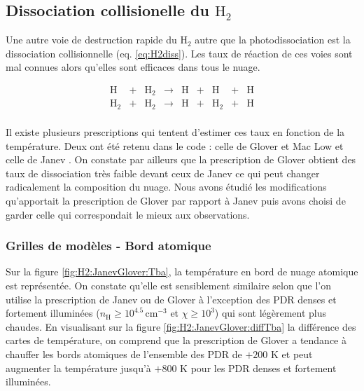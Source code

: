 
\subsection{Dissociation collisionelle du $\mathrm{H}_2$}

Une autre voie de destruction rapide du $\mathrm{H}_2$ autre que la photodissociation est la dissociation collisionnelle (eq. \ref{eq:H2diss}). Les taux de réaction de ces voies sont mal connues alors qu'elles sont efficaces dans tous le nuage.

\begin{equation}\label{eq:H2diss}
    \begin{array}{lcccccccl}
        \mathrm{H} & + & \mathrm{H}_2   & \rightarrow &\mathrm{H}  & + & \mathrm{H} & + & \mathrm{H} \\
        \mathrm{H}_2  & + & \mathrm{H}_2  & \rightarrow & \mathrm{H} & + &\mathrm{H}_2  & + & \mathrm{H} \\
    \end{array}
\end{equation}

Il existe plusieurs prescriptions qui tentent d'estimer ces taux en fonction de la température. Deux ont été retenu dans le code : celle de Glover et Mac Low \cite{GloverMacLow_2007} et celle de Janev \cite{Janev2003}. On constate par ailleurs que la prescription de Glover obtient des taux de dissociation très faible devant ceux de Janev ce qui peut changer radicalement la composition du nuage. Nous avons étudié les modifications qu'apportait la prescription de Glover par rapport à Janev puis avons choisi de garder celle qui correspondait le mieux aux observations.


\subsubsection{Grilles de modèles - Bord atomique}

Sur la figure \ref{fig:H2:JanevGlover:Tba}, la température en bord de nuage atomique est représentée. On constate qu'elle est sensiblement similaire selon que l'on utilise la prescription de Janev ou de Glover à l'exception des PDR denses et fortement illuminées ($n_\mathrm{H} \geq 10^{4.5} \, \mathrm{cm}^{-3}$ et $\chi \geq 10^3$) qui sont légèrement plus chaudes. En visualisant sur la figure \ref{fig:H2:JanevGlover:diffTba} la différence des cartes de température, on comprend que la prescription de Glover a tendance à chauffer les bords atomiques de l'ensemble des PDR de $+200$ K et peut augmenter la température jusqu'à $+800$ K pour les PDR denses et fortement illuminées. \newline

